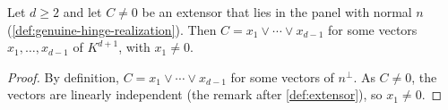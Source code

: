 \begin{lemma}
  \label{lem:extensor-in-panel-decomposable}
  \leanok
  Let $d \ge 2$ and let $C \neq 0$ be an extensor that lies in the
  panel with normal $n$ (\cref{def:genuine-hinge-realization}). Then
  $C = x_1 \vee \cdots \vee x_{d-1}$ for some vectors
  $x_1, \dots, x_{d-1}$ of $K^{d+1}$, with $x_1 \neq 0$.
\end{lemma}
\begin{proof}
  \leanok
  By definition, $C = x_1 \vee \cdots \vee x_{d-1}$ for some vectors of
  $n^\perp$. As $C \neq 0$, the vectors are linearly independent (the
  remark after \cref{def:extensor}), so $x_1 \neq 0$.
\end{proof}

